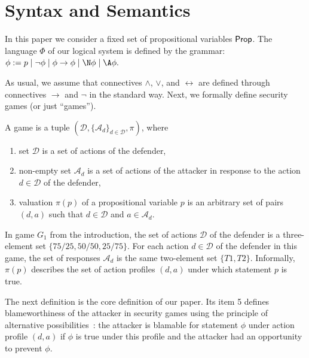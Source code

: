 \documentclass[letterpaper]{article}
\begin{document}
\section{Syntax and Semantics}\label{syntax and semantics section}

In this paper we consider a fixed set of propositional variables $\sf Prop$.
The language $\Phi$ of our logical system is defined by the grammar:
$
\phi := p\;|\;\neg\phi\;|\;\phi\to\phi\;|\;\N\phi\;|\; \A\phi.
$

As usual, we assume that connectives $\wedge$, $\vee$, and $\leftrightarrow$ are defined through connectives $\to$ and $\neg$ in the standard way. Next, we formally define security games (or just ``games'').

\begin{definition}\label{game definition}
A game is a tuple $(\mathcal{D},\{\mathcal{A}_d\}_{d\in\mathcal{D}},\pi)$, where
\begin{enumerate}
    \item set $\mathcal{D}$ is a set of actions of the defender,
    \item non-empty set $\mathcal{A}_d$ is a set of actions of the attacker in response to the action $d\in\mathcal{D}$ of the defender,
    \item valuation $\pi(p)$ of a propositional variable $p$ is an arbitrary set of pairs $(d,a)$ such that $d\in\mathcal{D}$ and $a\in\mathcal{A}_d$.
\end{enumerate}
\end{definition}

In game $G_1$ from the introduction, the set of actions $\mathcal{D}$ of the defender is a three-element set $\{75/25,50/50,25/75\}$. For each action $d\in\mathcal{D}$ of the defender in this game, the set of responses $\mathcal{A}_d$ is the same two-element set $\{T1,T2\}$. Informally, $\pi(p)$ describes the set of action profiles $(d,a)$ under which statement $p$ is true.

The next definition is the core definition of our paper. Its item 5 defines blameworthiness of the attacker in security games using the principle of alternative possibilities~\cite{f69tjop,w17}: the attacker is blamable for statement $\phi$ under action profile $(d,a)$ if $\phi$ is true under this profile and the attacker had an opportunity to prevent $\phi$.
\end{document}
